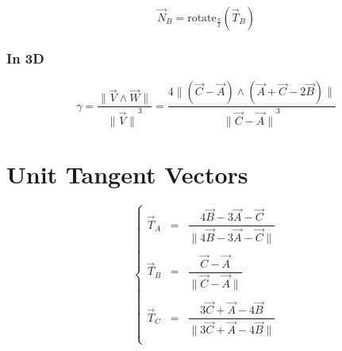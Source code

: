 \documentclass[aps,10pt]{revtex4}
\newcommand{\mynorm}[1]{{\parallel{#1}\parallel}}
\newcommand{\myunit}[1]{\dfrac{{#1}}{\mynorm{{#1}}}}
\begin{document}
\begin{equation}
	\vec{N}_{B} = \mathrm{rotate}_{\frac{\pi}{2}} \left(\vec{T}_B\right)
\end{equation}

\subsubsection{In 3D}

\begin{equation}
	\gamma = \dfrac{\mynorm{\vec{V}\wedge\vec{W}}}{\mynorm{\vec{V}}^3} = 
	\dfrac{4\mynorm{\left(\vec{C}-\vec{A}\right)\wedge\left(\vec{A}+\vec{C}-2\vec{B}\right)}}
	{\mynorm{\vec{C}-\vec{A}}^3}
\end{equation}



\section{Unit Tangent Vectors}

\begin{equation}
\left\lbrace
\begin{array}{rcl}
	\vec{T}_A & = & \myunit{4\vec{B}-3\vec{A}-\vec{C}}\\
	\\
	\vec{T}_B & = & \myunit{\vec{C}-\vec{A}}  \\
	\\
	\vec{T}_C & = & \myunit{3\vec{C}+\vec{A}-4\vec{B}}\\
\end{array}
\right.
\end{equation}
\end{document}
